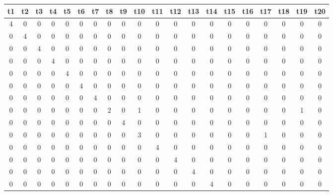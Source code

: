 \documentclass{IEEEtran}
\begin{document}
\begin{table}[h!]
\centering
\begin{tabular}{|c|c|c|c|c|c|c|c|c|c|c|c|c|c|c|c|c|c|c|c|}
\hline
\textbf{t1} & \textbf{t2} & \textbf{t3} & \textbf{t4} & \textbf{t5} & \textbf{t6} & \textbf{t7} & \textbf{t8} & \textbf{t9} & \textbf{t10} & \textbf{t11} & \textbf{t12} &
\textbf{t13} & \textbf{t14} & \textbf{t15} & \textbf{t16} & \textbf{t17} & \textbf{t18} &
\textbf{t19} & \textbf{t20} \\
\hline
\cellcolor{blue!25}4 & 0 & 0 & 0 & 0 & 0 & 0 & 0 & 0 & 0 & 0 & 0 & 0 & 0 & 0 & 0 & 0 & 0 & 0 & 0\\
\hline
0 & \cellcolor{blue!25}4 & 0 & 0 & 0 & 0 & 0 & 0 & 0 & 0 & 0 & 0 & 0 & 0 & 0 & 0 & 0 & 0 & 0 & 0\\
\hline
0 & 0 & \cellcolor{blue!25}4 & 0 & 0 & 0 & 0 & 0 & 0 & 0 & 0 & 0 & 0 & 0 & 0 & 0 & 0 & 0 & 0 & 0\\
\hline
0 & 0 & 0 & \cellcolor{blue!25}4 & 0 & 0 & 0 & 0 & 0 & 0 & 0 & 0 & 0 & 0 & 0 & 0 & 0 & 0 & 0 & 0\\
\hline
0 & 0 & 0 & 0 & \cellcolor{blue!25}4 & 0 & 0 & 0 & 0 & 0 & 0 & 0 & 0 & 0 & 0 & 0 & 0 & 0 & 0 & 0\\
\hline
0 & 0 & 0 & 0 & 0 & \cellcolor{blue!25}4 & 0 & 0 & 0 & 0 & 0 & 0 & 0 & 0 & 0 & 0 & 0 & 0 & 0 & 0\\
\hline
0 & 0 & 0 & 0 & 0 & 0 & \cellcolor{blue!25}4 & 0 & 0 & 0 & 0 & 0 & 0 & 0 & 0 & 0 & 0 & 0 & 0 & 0\\
\hline
0 & 0 & 0 & 0 & 0 & 0 & 0 & \cellcolor{blue!25}2 & 0 & \cellcolor{red!25}1 & 0 & 0 & 0 & 0 & 0 & 0 & 0 & 0 & \cellcolor{red!25}1 & 0\\
\hline
0 & 0 & 0 & 0 & 0 & 0 & 0 & 0 & \cellcolor{blue!25}4 & 0 & 0 & 0 & 0 & 0 & 0 & 0 & 0 & 0 & 0 & 0\\
\hline
0 & 0 & 0 & 0 & 0 & 0 & 0 & 0 & 0 & \cellcolor{blue!25}3 & 0 & 0 & 0 & 0 & 0 & 0 & \cellcolor{red!25}1 & 0 & 0 & 0\\
\hline
0 & 0 & 0 & 0 & 0 & 0 & 0 & 0 & 0 & 0 & \cellcolor{blue!25}4 & 0 & 0 & 0 & 0 & 0 & 0 & 0 & 0 & 0\\
\hline
0 & 0 & 0 & 0 & 0 & 0 & 0 & 0 & 0 & 0 & 0 & \cellcolor{blue!25}4 & 0 & 0 & 0 & 0 & 0 & 0 & 0 & 0\\
\hline
0 & 0 & 0 & 0 & 0 & 0 & 0 & 0 & 0 & 0 & 0 & 0 & \cellcolor{blue!25}4 & 0 & 0 & 0 & 0 & 0 & 0 & 0\\
\hline
0 & 0 & 0 & 0 & 0 & 0 & 0 & 0 & 0 & 0 & 0 & 0 & 0 & \cellcolor{blue!25}4 & 0 & 0 & 0 & 0 & 0 & 0\\

\end{tabular}
\end{table}
\end{document}
